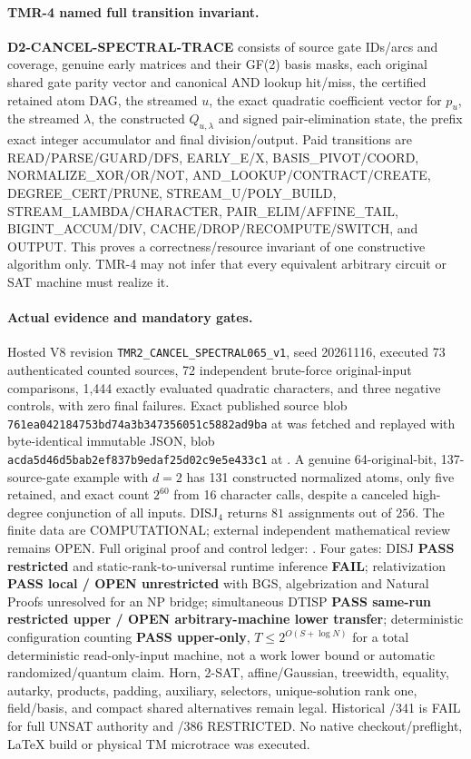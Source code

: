 \documentclass[11pt]{article}
\begin{document}
\paragraph{TMR-4 named full transition invariant.}
\textbf{D2-CANCEL-SPECTRAL-TRACE} consists of source gate IDs/arcs
and coverage, genuine early matrices and their GF(2) basis masks,
each original shared gate parity vector and canonical AND lookup
hit/miss, the certified retained atom DAG, the streamed $u$,
the exact quadratic coefficient vector for $p_u$, the streamed
$\lambda$, the constructed $Q_{u,\lambda}$ and signed pair-elimination
state, the prefix exact integer accumulator and final division/output.
Paid transitions are READ/PARSE/GUARD/DFS, EARLY\_E/X,
BASIS\_PIVOT/COORD, NORMALIZE\_XOR/OR/NOT,
AND\_LOOKUP/CONTRACT/CREATE, DEGREE\_CERT/PRUNE,
STREAM\_U/POLY\_BUILD, STREAM\_LAMBDA/CHARACTER,
PAIR\_ELIM/AFFINE\_TAIL, BIGINT\_ACCUM/DIV,
CACHE/DROP/RECOMPUTE/SWITCH, and OUTPUT.
This proves a correctness/resource invariant of one
constructive algorithm only. TMR-4 may not infer that every
equivalent arbitrary circuit or SAT machine must realize it.

\paragraph{Actual evidence and mandatory gates.}
Hosted V8 revision \texttt{TMR2\_CANCEL\_SPECTRAL065\_v1},
seed 20261116, executed 73 authenticated counted sources,
72 independent brute-force original-input comparisons,
1,444 exactly evaluated quadratic characters, and three
negative controls, with zero final failures. Exact published
source blob \texttt{761ea042184753bd74a3b347356051c5882ad9ba}
at 
was fetched and replayed with byte-identical immutable JSON,
blob \texttt{acda5d46d5bab2ef837b9edaf25d02c9e5e433c1}
at .
A genuine 64-original-bit, 137-source-gate example with
$d=2$ has 131 constructed normalized atoms, only five
retained, and exact count $2^{60}$ from 16 character calls,
despite a canceled high-degree conjunction of all inputs.
DISJ$_4$ returns $81$ assignments out of $256$.
The finite data are COMPUTATIONAL; external independent
mathematical review remains OPEN.
Full original proof and control ledger:
.
Four gates: DISJ \textbf{PASS restricted} and static-rank-to-universal
runtime inference \textbf{FAIL}; relativization
\textbf{PASS local / OPEN unrestricted} with BGS,
algebrization and Natural Proofs unresolved for an NP bridge;
simultaneous DTISP \textbf{PASS same-run restricted upper /
OPEN arbitrary-machine lower transfer}; deterministic configuration
counting \textbf{PASS upper-only}, $T\le2^{O(S+\log N)}$
for a total deterministic read-only-input machine, not
a work lower bound or automatic randomized/quantum claim.
Horn, 2-SAT, affine/Gaussian, treewidth, equality,
autarky, products, padding, auxiliary, selectors, unique-solution
rank one, field/basis, and compact shared alternatives remain legal.
Historical /341 is FAIL for full UNSAT authority and /386
RESTRICTED. No native checkout/preflight, LaTeX build or physical
TM microtrace was executed.
\end{document}

